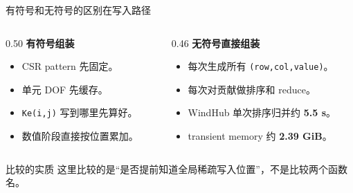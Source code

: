 \documentclass[UTF8,aspectratio=169,10pt]{ctexbeamer}
\newcommand{\metric}[1]{\textcolor{pgsaGreen}{\textbf{#1}}}
\begin{document}
\begin{frame}{有符号和无符号的区别在写入路径}
\begin{columns}[T,onlytextwidth]
\begin{column}{0.50\textwidth}
\textbf{有符号组装}
\begin{itemize}
  \item CSR pattern 先固定。
  \item 单元 DOF 先缓存。
  \item \texttt{Ke(i,j)} 写到哪里先算好。
  \item 数值阶段直接按位置累加。
\end{itemize}
\end{column}
\begin{column}{0.46\textwidth}
\textbf{无符号直接组装}
\begin{itemize}
  \item 每次生成所有 \texttt{(row,col,value)}。
  \item 每次对贡献做排序和 reduce。
  \item WindHub 单次排序归并约 \metric{5.5 s}。
  \item transient memory 约 \metric{2.39 GiB}。
\end{itemize}
\end{column}
\end{columns}
\begin{block}{比较的实质}
这里比较的是“是否提前知道全局稀疏写入位置”，不是比较两个函数名。
\end{block}
\end{frame}
\end{document}
